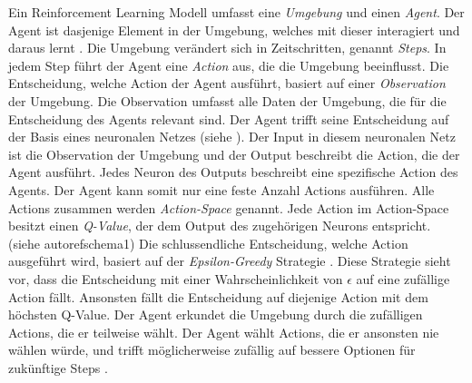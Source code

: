 Ein Reinforcement Learning Modell umfasst eine \emph{Umgebung} und einen
\emph{Agent}. Der Agent ist dasjenige Element in der Umgebung, welches mit
dieser interagiert und daraus lernt \cite[S. 53]{sutton_reinforcement_2014}. Die
Umgebung verändert sich in Zeitschritten, genannt \emph{Steps}. In jedem Step
führt der Agent eine \emph{Action} aus, die die Umgebung beeinflusst. Die
Entscheidung, welche Action der Agent ausführt, basiert auf einer
\emph{Observation} \cite[S. 2]{mnih_playing_nodate} der Umgebung. Die
Observation umfasst alle Daten der Umgebung, die für die Entscheidung des Agents
relevant sind. Der Agent trifft seine Entscheidung auf der Basis eines
neuronalen Netzes (siehe ). Der Input in diesem neuronalen
Netz ist die Observation der Umgebung und der Output beschreibt die Action, die
der Agent ausführt. Jedes Neuron des Outputs beschreibt eine spezifische Action
des Agents. Der Agent kann somit nur eine feste Anzahl Actions ausführen. Alle
Actions zusammen werden \emph{Action-Space} \cite[S.
67]{sutton_reinforcement_2014} genannt. Jede Action im Action-Space besitzt
einen \emph{Q-Value}, der dem Output des zugehörigen Neurons entspricht. (siehe
autoref{schema1}) \cite{wang_deep_2021} Die schlussendliche Entscheidung, welche
Action ausgeführt wird, basiert auf der \emph{Epsilon-Greedy} Strategie \cite[S.
34]{sutton_reinforcement_2014}. Diese Strategie sieht vor, dass die Entscheidung
mit einer Wahrscheinlichkeit von $\epsilon$ auf eine zufällige Action fällt.
Ansonsten fällt die Entscheidung auf diejenige Action mit dem höchsten Q-Value.
Der Agent erkundet die Umgebung durch die zufälligen Actions, die er teilweise
wählt. Der Agent wählt Actions, die er ansonsten nie wählen würde, und trifft
möglicherweise zufällig auf bessere Optionen für zukünftige Steps
\cite{rajendra_koppula_exploration_nodate}.


